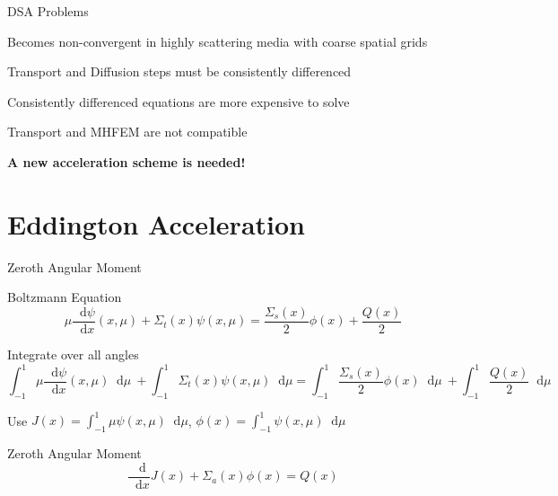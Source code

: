 \documentclass[10pt]{beamer}
\newcommand{\ud}{\mathop{}\!\mathrm{d}} %
\newcommand{\dderiv}[2]{\frac{\ud #1}{\ud #2}}
\begin{document}
\begin{frame}{DSA Problems}

    Becomes non-convergent in highly scattering media with coarse spatial grids 

    Transport and Diffusion steps must be consistently differenced 

    Consistently differenced equations are more expensive to solve 

    Transport and MHFEM are not compatible

    \vfill 
    \centerline{\textbf{A new acceleration scheme is needed!}}

\end{frame}

\section{Eddington Acceleration}

\begin{frame}{Zeroth Angular Moment}

    \onslide<+->
	Boltzmann Equation
	\begin{equation*}
	        \mu \dderiv{\psi}{x}(x, \mu) + 
	        \Sigma_t(x) \psi(x,\mu) = 
	        \frac{\Sigma_s(x)}{2} \phi(x) + 
	        \frac{Q(x)}{2} 
	\end{equation*}

    \onslide<+->
	Integrate over all angles \footnotesize
	\begin{equation*}
	    \int_{-1}^{1} \mu \dderiv{\psi}{x}(x, \mu) \ud \mu \ + 
	    \int_{-1}^{1} \Sigma_t(x) \psi(x,\mu) \ud \mu = 
	    \int_{-1}^{1} \frac{\Sigma_s(x)}{2} \phi(x) \ud \mu \ + 
	    \int_{-1}^{1} \frac{Q(x)}{2} \ud \mu 
	\end{equation*}
    \normalsize

    \onslide<+->
	Use $J(x) = \int_{-1}^{1} \mu \psi(x,\mu) \ud \mu$, 
		$\phi(x) = \int_{-1}^{1} \psi(x,\mu) \ud \mu$ 
	\begin{block}{Zeroth Angular Moment}
	\begin{equation*}
		\dderiv{}{x} J(x) + \Sigma_a(x) \phi(x) = Q(x)
	\end{equation*}
	\end{block}

\end{frame}
\end{document}
